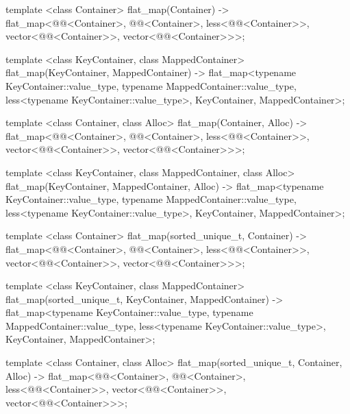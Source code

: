 \begin{codeblock}
\begin{codeblock}
\begin{codeblock}
\begin{addedblock}
\begin{codeblock}
{  template <class Container>
    flat_map(Container)
      -> flat_map<@@<Container>, @@<Container>,
                  less<@@<Container>>,
                  vector<@@<Container>>,
                  vector<@@<Container>>>;

  template <class KeyContainer, class MappedContainer>
    flat_map(KeyContainer, MappedContainer)
      -> flat_map<typename KeyContainer::value_type,
                  typename MappedContainer::value_type,
                  less<typename KeyContainer::value_type>,
                  KeyContainer, MappedContainer>;

  template <class Container, class Alloc>
    flat_map(Container, Alloc)
      -> flat_map<@@<Container>, @@<Container>,
                  less<@@<Container>>,
                  vector<@@<Container>>,
                  vector<@@<Container>>>;

  template <class KeyContainer, class MappedContainer, class Alloc>
    flat_map(KeyContainer, MappedContainer, Alloc)
      -> flat_map<typename KeyContainer::value_type,
                  typename MappedContainer::value_type,
                  less<typename KeyContainer::value_type>,
                  KeyContainer, MappedContainer>;

  template <class Container>
    flat_map(sorted_unique_t, Container)
      -> flat_map<@@<Container>, @@<Container>,
                  less<@@<Container>>,
                  vector<@@<Container>>,
                  vector<@@<Container>>>;

  template <class KeyContainer, class MappedContainer>
    flat_map(sorted_unique_t, KeyContainer, MappedContainer)
      -> flat_map<typename KeyContainer::value_type,
                  typename MappedContainer::value_type,
                  less<typename KeyContainer::value_type>,
                  KeyContainer, MappedContainer>;

  template <class Container, class Alloc>
    flat_map(sorted_unique_t, Container, Alloc)
      -> flat_map<@@<Container>, @@<Container>,
                  less<@@<Container>>,
                  vector<@@<Container>>,
                  vector<@@<Container>>>;

}
\end{codeblock}
\end{addedblock}
\end{codeblock}
\end{codeblock}
\end{codeblock}
